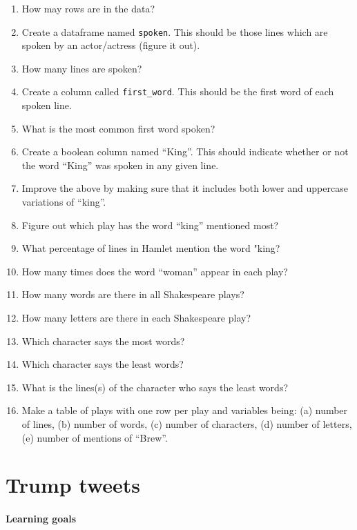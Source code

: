 \documentclass[
]{book}
\begin{document}
\begin{enumerate}
\def\labelenumi{\arabic{enumi}.}
\item
  How may rows are in the data?
\item
  Create a dataframe named \texttt{spoken}. This should be those lines which are spoken by an actor/actress (figure it out).
\item
  How many lines are spoken?
\item
  Create a column called \texttt{first\_word}. This should be the first word of each spoken line.
\item
  What is the most common first word spoken?
\item
  Create a boolean column named ``King''. This should indicate whether or not the word ``King'' was spoken in any given line.
\item
  Improve the above by making sure that it includes both lower and uppercase variations of ``king''.
\item
  Figure out which play has the word ``king'' mentioned most?
\item
  What percentage of lines in Hamlet mention the word "king?
\item
  How many times does the word ``woman'' appear in each play?
\item
  How many words are there in all Shakespeare plays?
\item
  How many letters are there in each Shakespeare play?
\item
  Which character says the most words?
\item
  Which character says the least words?
\item
  What is the lines(s) of the character who says the least words?
\item
  Make a table of plays with one row per play and variables being: (a) number of lines, (b) number of words, (c) number of characters, (d) number of letters, (e) number of mentions of ``Brew''.
\end{enumerate}

\hypertarget{trump}{%
\chapter{Trump tweets}\label{trump}}

\hypertarget{learning-goals-14}{%
\subsubsection*{Learning goals}\label{learning-goals-14}}
\end{document}
